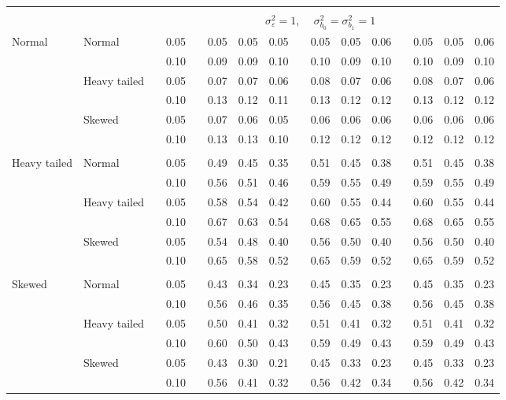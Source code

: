 \documentclass{article} %
\begin{document}
\begin{table}[ht]
\begin{scriptsize}
\begin{center}
\begin{tabular}{ll p{.1cm} c p{.1cm} rrr p{.1cm} rrr p{.1cm} rrr}
&&&&&&&&&&&&&&&\\
& && && \multicolumn{9}{c}{$\sigma_{\varepsilon}^2 = 1$, \ \ $\sigma_{b_0}^2 = \sigma_{b_1}^2 = 1$} \\ \cline{6-16}
\rowcolor{gray!20}Normal       & Normal       && 0.05 &&   0.05 & 0.05 & 0.05 && 0.05 & 0.05 & 0.06 && 0.05 & 0.05 & 0.06 \\ 
\rowcolor{gray!20}             &              && 0.10 &&   0.09 & 0.09 & 0.10 && 0.10 & 0.09 & 0.10 && 0.10 & 0.09 & 0.10 \\ 
\rowcolor{gray!20}             & Heavy tailed && 0.05 &&   0.07 & 0.07 & 0.06 && 0.08 & 0.07 & 0.06 && 0.08 & 0.07 & 0.06 \\ 
\rowcolor{gray!20}             &              && 0.10 &&   0.13 & 0.12 & 0.11 && 0.13 & 0.12 & 0.12 && 0.13 & 0.12 & 0.12 \\ 
\rowcolor{gray!20}             & Skewed       && 0.05 &&   0.07 & 0.06 & 0.05 && 0.06 & 0.06 & 0.06 && 0.06 & 0.06 & 0.06 \\ 
\rowcolor{gray!20}             &              && 0.10 &&   0.13 & 0.13 & 0.10 && 0.12 & 0.12 & 0.12 && 0.12 & 0.12 & 0.12 \\ 
             &&&&&&&&&&&&&&&\\
Heavy tailed & Normal       && 0.05 &&   0.49 & 0.45 & 0.35 && 0.51 & 0.45 & 0.38 && 0.51 & 0.45 & 0.38 \\ 
             &              && 0.10 &&   0.56 & 0.51 & 0.46 && 0.59 & 0.55 & 0.49 && 0.59 & 0.55 & 0.49 \\ 
             & Heavy tailed && 0.05 &&   0.58 & 0.54 & 0.42 && 0.60 & 0.55 & 0.44 && 0.60 & 0.55 & 0.44 \\ 
             &              && 0.10 &&   0.67 & 0.63 & 0.54 && 0.68 & 0.65 & 0.55 && 0.68 & 0.65 & 0.55 \\ 
             & Skewed       && 0.05 &&   0.54 & 0.48 & 0.40 && 0.56 & 0.50 & 0.40 && 0.56 & 0.50 & 0.40 \\ 
             &              && 0.10 &&   0.65 & 0.58 & 0.52 && 0.65 & 0.59 & 0.52 && 0.65 & 0.59 & 0.52 \\ 
             &&&&&&&&&&&&&&&\\
Skewed       & Normal       && 0.05 &&   0.43 & 0.34 & 0.23 && 0.45 & 0.35 & 0.23 && 0.45 & 0.35 & 0.23 \\ 
             &              && 0.10 &&   0.56 & 0.46 & 0.35 && 0.56 & 0.45 & 0.38 && 0.56 & 0.45 & 0.38 \\ 
             & Heavy tailed && 0.05 &&   0.50 & 0.41 & 0.32 && 0.51 & 0.41 & 0.32 && 0.51 & 0.41 & 0.32 \\ 
             &              && 0.10 &&   0.60 & 0.50 & 0.43 && 0.59 & 0.49 & 0.43 && 0.59 & 0.49 & 0.43 \\ 
             & Skewed       && 0.05 &&   0.43 & 0.30 & 0.21 && 0.45 & 0.33 & 0.23 && 0.45 & 0.33 & 0.23 \\ 
             &              && 0.10 &&   0.56 & 0.41 & 0.32 && 0.56 & 0.42 & 0.34 && 0.56 & 0.42 & 0.34 \\ 



\end{tabular}
\end{center}
\end{scriptsize}
\end{table}
\end{document}
